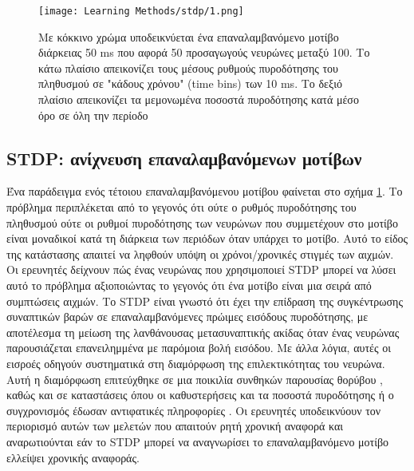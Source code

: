 \documentclass[12pt]{report}
\begin{document}
\begin{figure}[htp]
    \centering
    \texttt{[image: Learning Methods/stdp/1.png]}
    \caption{Με κόκκινο χρώμα υποδεικνύεται ένα επαναλαμβανόμενο μοτίβο διάρκειας 50 \textlatin{ms} που αφορά 50 προσαγωγούς νευρώνες μεταξύ 100. Το κάτω πλαίσιο απεικονίζει τους μέσους ρυθμούς πυροδότησης του πληθυσμού σε "κάδους χρόνου" (\textlatin{time bins}) των 10 \textlatin{ms}. Το δεξιό πλαίσιο απεικονίζει τα μεμονωμένα ποσοστά πυροδότησης κατά μέσο όρο σε όλη την περίοδο}
    \label{fig:stdp-1}
\end{figure}
\subsection{\textlatin{STDP}: ανίχνευση επαναλαμβανόμενων μοτίβων}
Ένα παράδειγμα ενός τέτοιου επαναλαμβανόμενου μοτίβου φαίνεται στο σχήμα \ref{fig:stdp-1}. Το πρόβλημα περιπλέκεται από το γεγονός ότι ούτε ο ρυθμός πυροδότησης του πληθυσμού ούτε οι ρυθμοί πυροδότησης των νευρώνων που συμμετέχουν στο μοτίβο είναι μοναδικοί κατά τη διάρκεια των περιόδων όταν υπάρχει το μοτίβο. Αυτό το είδος της κατάστασης απαιτεί να ληφθούν υπόψη οι χρόνοι/χρονικές στιγμές των αιχμών. Οι ερευνητές δείχνουν πώς ένας νευρώνας που χρησιμοποιεί \textlatin{STDP} μπορεί να λύσει αυτό το πρόβλημα αξιοποιώντας το γεγονός ότι ένα μοτίβο είναι μια σειρά από συμπτώσεις αιχμών. Το \textlatin{STDP} είναι γνωστό ότι έχει την επίδραση της συγκέντρωσης συναπτικών βαρών σε επαναλαμβανόμενες πρώιμες εισόδους πυροδότησης, με αποτέλεσμα τη μείωση της λανθάνουσας μετασυναπτικής ακίδας όταν ένας νευρώνας παρουσιάζεται επανειλημμένα με παρόμοια βολή εισόδου. Με άλλα λόγια, αυτές οι εισροές οδηγούν συστηματικά στη διαμόρφωση της επιλεκτικότητας του νευρώνα. Αυτή η διαμόρφωση επιτεύχθηκε σε μια ποικιλία συνθηκών παρουσίας θορύβου , καθώς και σε καταστάσεις όπου οι καθυστερήσεις και τα ποσοστά πυροδότησης ή ο συγχρονισμός έδωσαν αντιφατικές πληροφορίες \cite {rossum2000} \cite {guyonneau2005} \cite {masquelier2007}. Οι ερευνητές υποδεικνύουν τον περιορισμό αυτών των μελετών που απαιτούν ρητή χρονική αναφορά και αναρωτιούνται εάν το \textlatin{STDP} μπορεί να αναγνωρίσει το επαναλαμβανόμενο μοτίβο ελλείψει χρονικής αναφοράς.
\end{document}

